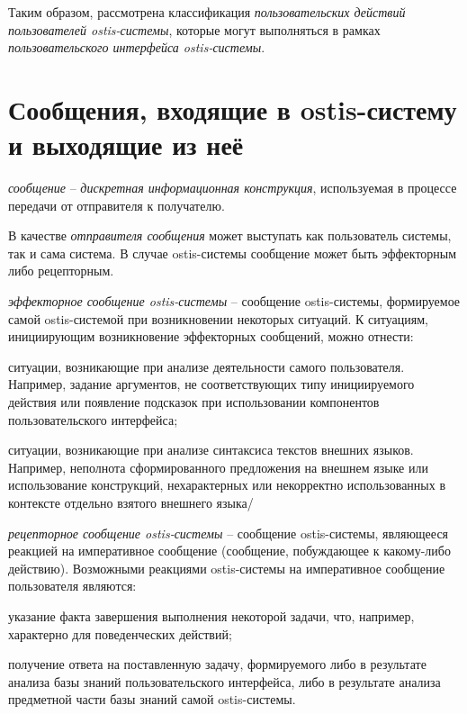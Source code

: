 Таким образом, рассмотрена классификация \textit{пользовательских действий пользователей ostis-системы}, которые могут выполняться в рамках \textit{пользовательского интерфейса ostis-системы}.

\section{Сообщения, входящие в ostis-систему и выходящие из неё}
\label{sec_messages}

\textit{сообщение} -- \textit{дискретная информационная конструкция}, используемая в процессе передачи от отправителя к получателю.

В качестве \textit{отправителя сообщения} может выступать как пользователь системы, так и сама система. В случае ostis-системы сообщение может быть эффекторным либо рецепторным.

\textit{эффекторное сообщение ostis-системы} -- сообщение ostis-системы, формируемое самой ostis-системой при возникновении некоторых ситуаций. К ситуациям, инициирующим возникновение эффекторных сообщений, можно отнести:
\begin{textitemize}
	\item ситуации, возникающие при анализе деятельности самого пользователя. Например, задание аргументов, не соответствующих типу инициируемого действия или появление подсказок при использовании компонентов пользовательского интерфейса;
	\item ситуации, возникающие при анализе синтаксиса текстов внешних языков. Например, неполнота сформированного предложения на внешнем языке или использование конструкций, нехарактерных или некорректно использованных в контексте отдельно взятого внешнего языка/
\end{textitemize}

\textit{рецепторное сообщение ostis-системы} -- сообщение ostis-системы, являющееся реакцией на императивное сообщение (сообщение, побуждающее к какому-либо действию). Возможными реакциями ostis-системы на императивное сообщение пользователя являются:
\begin{textitemize}
	\item указание факта завершения выполнения некоторой задачи, что, например, характерно для поведенческих действий;
	\item получение ответа на поставленную задачу, формируемого либо в результате анализа базы знаний	пользовательского интерфейса, либо в результате анализа предметной части базы знаний самой ostis-системы.
\end{textitemize}

